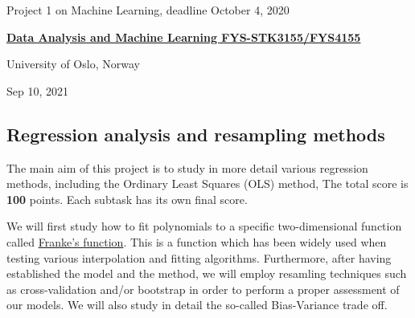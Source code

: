 \documentclass[%
oneside,                 %
final,                   %
10pt]{article}
\begin{document}

\newcommand{\exercisesection}[1]{\subsection*{#1}}






\thispagestyle{empty}

\begin{center}
{\LARGE\bf
\begin{spacing}{1.25}
Project 1 on Machine Learning, deadline October 4, 2020
\end{spacing}
}
\end{center}


\begin{center}
{\bf \href{{http://www.uio.no/studier/emner/matnat/fys/FYS3155/index-eng.html}}{Data Analysis and Machine Learning FYS-STK3155/FYS4155}}
\end{center}

    \begin{center}
\centerline{{\small University of Oslo, Norway}}
\end{center}
    

\begin{center}
Sep 10, 2021
\end{center}

\vspace{1cm}


\subsection{Regression analysis and resampling methods}

The main aim of this project is to study in more detail various
regression methods, including the Ordinary Least Squares (OLS) method,
The total score is \textbf{100} points. Each subtask has its own final score.


We will first study how to fit polynomials to a specific
two-dimensional function called \href{{http://www.dtic.mil/dtic/tr/fulltext/u2/a081688.pdf}}{Franke's
function}.  This
is a function which has been widely used when testing various
interpolation and fitting algorithms. Furthermore, after having
established the model and the method, we will employ resamling
techniques such as cross-validation and/or bootstrap in order to perform a
proper assessment of our models. We will also study in detail the
so-called Bias-Variance trade off.
\end{document}
